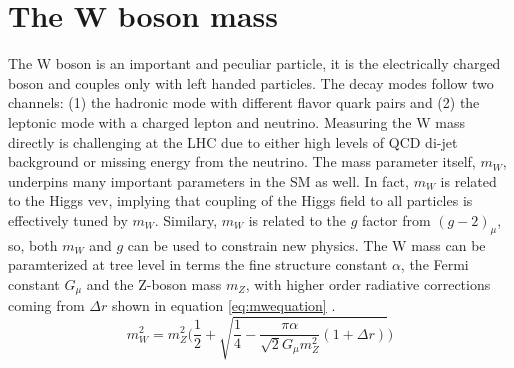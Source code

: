 

\section{The W boson mass}

The W boson is an important and peculiar particle, it is the electrically charged boson and couples only with left handed particles. The decay modes follow two channels: (1) the hadronic mode with different flavor quark pairs and (2) the leptonic mode with a charged lepton and neutrino. Measuring the W mass directly is challenging at the LHC due to either high levels of QCD di-jet background or missing energy from the neutrino. The mass parameter itself, $m_W$, underpins many important parameters in the SM as well. In fact, $m_W$ is related to the Higgs vev, implying that coupling of the Higgs field to all particles is effectively tuned by $m_W$. Similary, $m_W$ is related to the $g$ factor from $(g-2)_\mu$, so, both $m_W$ and $g$ can be used to constrain new physics. The W mass can be paramterized at tree level in terms the fine structure constant $\alpha$, the Fermi constant $G_\mu$ and the Z-boson mass $m_Z$, with higher order radiative corrections coming from $\Delta r$ shown in equation \ref{eq:mwequation} \cite{Awramik:2003rn}.
\begin{equation}
\label{eq:mwequation}
m_W^2 = m_Z^2\Bigg(\frac{1}{2} + \sqrt{\frac{1}{4} - \frac{\pi\alpha}{\sqrt{2}G_\mu m_{Z}^2 }(1+\Delta r) } \Bigg)
\end{equation}

